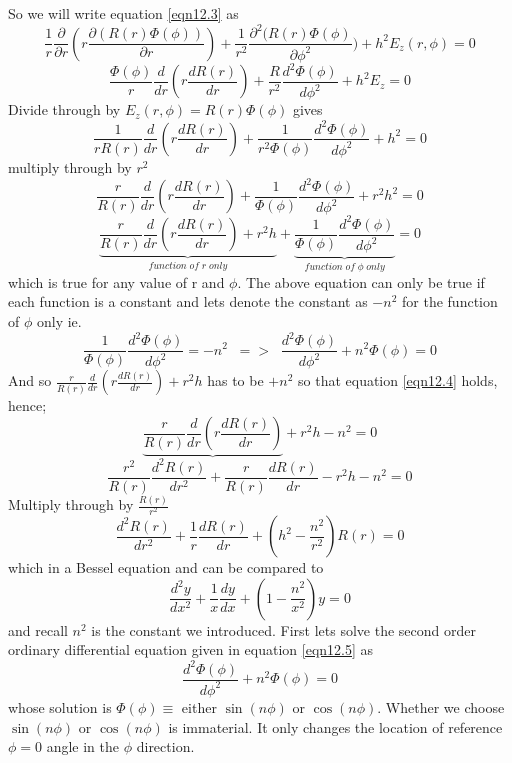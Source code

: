 So we will write equation \ref{eqn12.3} as 
$$ 
\frac{1}{r}\frac{\partial}{\partial r}(r\frac{\partial(R(r)\Phi(\phi))}{\partial r}) + \frac{1}{r^2}\frac{\partial^2 (R(r)\Phi(\phi)}{\partial \phi^2}) + h^2E_z(r,\phi) = 0
$$
$$
\frac{\Phi(\phi)}{r}\frac{d}{dr}\left(r\frac{dR(r)}{dr}\right) + \frac{R}{r^2}\frac{d^2\Phi(\phi)}{d\phi^2} + h^2 E_z = 0
$$
Divide through by $E_z(r, \phi)=R(r)\Phi(\phi)$ gives 
$$
\frac{1}{rR(r)}\frac{d}{dr}\left(r\frac{dR(r)}{dr}\right) + \frac{1}{r^2\Phi(\phi)}\frac{d^2\Phi(\phi)}{d\phi^2} + h^2 = 0
$$
multiply through by $r^2$
$$
\frac{r}{R(r)}\frac{d}{dr}\left(r\frac{dR(r)}{dr}\right) + \frac{1}{\Phi(\phi)}\frac{d^2\Phi(\phi)}{d\phi^2} + r^2h^2=0
$$
\begin{dmath}
\underbrace{\frac{r}{R(r)}\frac{d}{dr}\left(r\frac{dR(r)}{dr}\right)	+ r^2 h}_{function \; of\; r \; only} 
+ \underbrace{\frac{1}{\Phi(\phi)}\frac{d^2\Phi(\phi)}{d\phi^2}}_{function \; of \; \phi \; only} = 0 
\label{eqn12.4} 
\end{dmath}
which is true for any value of r and $\phi$. The above equation can only be true if each function is a constant and lets denote the constant as $-n^2$ for the function of $\phi$ only ie. 
\begin{equation}
\frac{1}{\Phi(\phi)}\frac{d^2\Phi(\phi)}{d\phi^2}=-n^2 \; \; => \;\; \frac{d^2\Phi(\phi)}{d\phi^2} + n^2\Phi(\phi) = 0
\label{eqn12.5}
\end{equation}
And so $\frac{r}{R(r)}\frac{d}{dr}(r\frac{dR(r)}{dr}) + r^2h$ has to be $+n^2$ so that equation \ref{eqn12.4} holds, hence;
$$
\underbrace{\frac{r}{R(r)}\frac{d}{dr}\left(r\frac{dR(r)}{dr}\right)} + r^2h-n^2=0
$$
$$
\frac{r^2}{R(r)}\frac{d^2R(r)}{dr^2} + \frac{r}{R(r)}\frac{dR(r)}{dr} - r^2h-n^2=0
$$
Multiply through by $\frac{R(r)}{r^2}$
\begin{equation}
\frac{d^2R(r)}{dr^2}+\frac{1}{r}\frac{dR(r)}{dr} + (h^2-\frac{n^2}{r^2})R(r)=0
\label{eqn12.6}
\end{equation}
which in a Bessel equation and can be compared to 
$$
\frac{d^2y}{dx^2}+\frac{1}{x}\frac{dy}{dx}+\left(1-\frac{n^2}{x^2}\right)y = 0
$$
and recall $n^2$ is the constant we introduced. First lets solve the second order ordinary differential equation given in equation \ref{eqn12.5} as
$$
\frac{d^2\Phi(\phi)}{d\phi^2} + n^2\Phi(\phi) = 0
$$
whose solution is $\Phi(\phi)\equiv $ either $\sin(n\phi)$ or $\cos(n\phi)$. Whether we choose $\sin(n\phi)$ or $\cos(n\phi)$ is immaterial. It only changes the location of reference $\phi=0$ angle in the $\phi$ direction.

